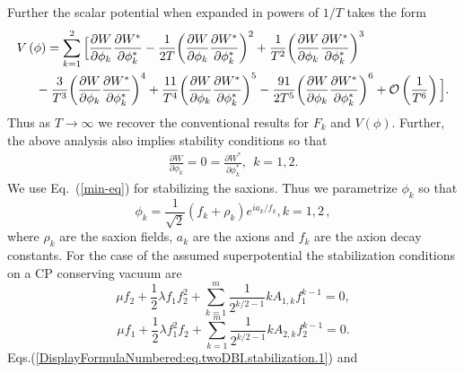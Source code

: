 \documentclass[a4paper,11pt]{article}
\begin{document}
  Further the scalar potential when expanded in powers of $1/T$ takes the form
  \begin{equation}
  \begin{split}
    & V\left(\phi \right)=\sum_{k=1}^2\Big[\frac{\partial W}{\partial \phi_k}\frac{\partial W^*}{\partial \phi^*_k}-\frac{1}{2T}{\left(\frac{\partial W}{\partial \phi_k}\frac{\partial W^*}{\partial \phi^*_k}\right)}^2+\frac{1}{T^2}{\left(\frac{\partial W}{\partial \phi_k}\frac{\partial W^*}{\partial \phi^*_k}\right)}^3 \\
    & \indent{}-\frac{3}{T^3}{\left(\frac{\partial W}{\partial \phi_k}\frac{\partial W^*}{\partial \phi^*_k}\right)}^4+\frac{11}{T^4}{\left(\frac{\partial W}{\partial \phi_k}\frac{\partial W^*}{\partial \phi^*_k}\right)}^5-\frac{91}{2T^5}{\left(\frac{\partial W}{\partial \phi_k}\frac{\partial W^*}{\partial \phi^*_k}\right)}^6+\mathcal{O}\left(\frac{1}{T^6}\right)\Big].
  \end{split}
  \label{vexpand}
  \end{equation}
  Thus as $T \rightarrow \infty$ we recover the conventional results for $F_k$ and $V\left(\phi\right)$. Further, the above analysis also implies stability conditions so that
  \begin{align}
    \frac{\partial W}{\partial \phi_k} = 0= \frac{\partial W^*}{\partial \phi^*_k}, ~~k=1,2.
    \label{min-eq}
  \end{align}
  We use Eq.~(\ref{min-eq}) for stabilizing the saxions. Thus we parametrize $\phi_k$ so that
  \begin{equation} \label{DisplayFormulaNumbered:eq.twoDBI.phi}
    \phi_k = \frac{1}{\sqrt 2} \left(f_k+\rho_k\right) e^{i a_k/f_k}, k=1,2\,,
  \end{equation}
  where $\rho_k$ are the saxion fields, $a_k$ are the axions and $f_k$ are the axion decay constants.
  For the case of the assumed superpotential the
  stabilization conditions on a CP conserving vacuum are
  \begin{equation} \label{DisplayFormulaNumbered:eq.twoDBI.stabilization.1}
    \mu f_2 + \frac{1}{2} \lambda f_1 f_2^2+\sum_{k=1}^m \frac{1}{2^{k/2-1}} k A_{1, k}f_1^{k-1}=0,
  \end{equation}
  \begin{equation} \label{DisplayFormulaNumbered:eq.twoDBI.stabilization.2}
    \mu f_1 + \frac{1}{2} \lambda f_1^2 f_2+\sum_{k=1}^m \frac{1}{2^{k/2-1}} k A_{2, k}f_2^{k-1}=0.
  \end{equation}
  Eqs.(\ref{DisplayFormulaNumbered:eq.twoDBI.stabilization.1}) and 
\end{document}
